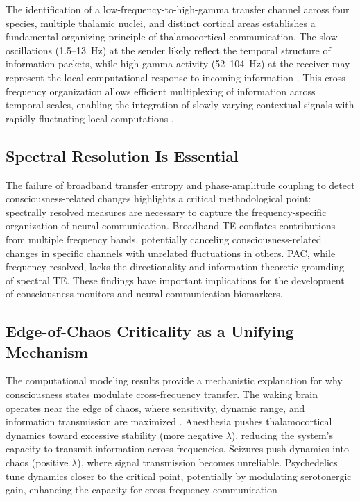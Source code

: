 \documentclass[11pt]{article}
\begin{document}
The identification of a low-frequency-to-high-gamma transfer channel across four species, multiple thalamic nuclei, and distinct cortical areas establishes a fundamental organizing principle of thalamocortical communication. The slow oscillations (1.5--13~Hz) at the sender likely reflect the temporal structure of information packets, while high gamma activity (52--104~Hz) at the receiver may represent the local computational response to incoming information \citep{canolty2010importance}. This cross-frequency organization allows efficient multiplexing of information across temporal scales, enabling the integration of slowly varying contextual signals with rapidly fluctuating local computations \citep{aru2015untangling}.

\subsection{Spectral Resolution Is Essential}

The failure of broadband transfer entropy and phase-amplitude coupling to detect consciousness-related changes highlights a critical methodological point: spectrally resolved measures are necessary to capture the frequency-specific organization of neural communication. Broadband TE conflates contributions from multiple frequency bands, potentially canceling consciousness-related changes in specific channels with unrelated fluctuations in others. PAC, while frequency-resolved, lacks the directionality and information-theoretic grounding of spectral TE. These findings have important implications for the development of consciousness monitors and neural communication biomarkers.

\subsection{Edge-of-Chaos Criticality as a Unifying Mechanism}

The computational modeling results provide a mechanistic explanation for why consciousness states modulate cross-frequency transfer. The waking brain operates near the edge of chaos, where sensitivity, dynamic range, and information transmission are maximized \citep{shew2013functional}. Anesthesia pushes thalamocortical dynamics toward excessive stability (more negative $\lambda$), reducing the system's capacity to transmit information across frequencies. Seizures push dynamics into chaos (positive $\lambda$), where signal transmission becomes unreliable. Psychedelics tune dynamics closer to the critical point, potentially by modulating serotonergic gain, enhancing the capacity for cross-frequency communication \citep{carhart2016neural}.
\end{document}
